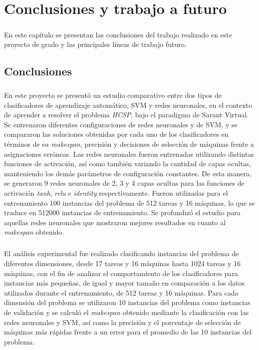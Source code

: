 \chapter{Conclusiones y trabajo a futuro} \label{section-conclusiones}

\paragraph{}En este capítulo se presentan las conclusiones del trabajo realizado en este proyecto de grado y las principales líneas de trabajo futuro.

\section{Conclusiones}

\paragraph{}En este proyecto se presentó un estudio comparativo entre dos tipos de clasificadores de aprendizaje automático, SVM y redes neuronales, en el contexto de aprender a resolver el problema \textit{HCSP}, bajo el paradigma de Savant Virtual.
Se entrenaron diferentes configuraciones de redes neuronales y de SVM, y se compararon las soluciones obtenidas por cada uno de los clasificadores en términos de su \textit{makespan}, precisión y decisiones de selección de máquinas frente a asignaciones erróneas.
Las redes neuronales fueron entrenadas utilizando distintas funciones de activación, así como también variando la cantidad de capas ocultas, manteniendo los demás parámetros de configuración constantes.
De esta manera, se generaron 9 redes neuronales de 2, 3 y 4 capas ocultas para las funciones de activación \textit{tanh}, \textit{relu} e \textit{identity} respectivamente.
Fueron utilizadas para el entrenamiento 100 instancias del problema de 512 tareas y 16 máquinas, lo que se traduce en 512000 instancias de entrenamiento.
Se profundizó el estudio para aquellas redes neuronales que mostraron mejores resultados en cuanto al \textit{makespan} obtenido.

\paragraph{}El análisis experimental fue realizado clasificando instancias del problema de diferentes dimensiones, desde 17 tareas y 16 máquinas hasta 1024 tareas y 16 máquinas, con el fin de analizar el comportamiento de los clasificadores para instancias más pequeñas, de igual y mayor tamaño en comparación a los datos utilizados durante el entrenamiento, de 512 tareas y 16 máquinas.
Para cada dimensión del problema se utilizaron 10 instancias del problema como instancias de validación y se calculó el \textit{makespan} obtenido mediante la clasificación con las redes neuronales y SVM, así como la precisión y el porcentaje de selección de máquinas más rápidas frente a un error para el promedio de las 10 instancias del problema.

